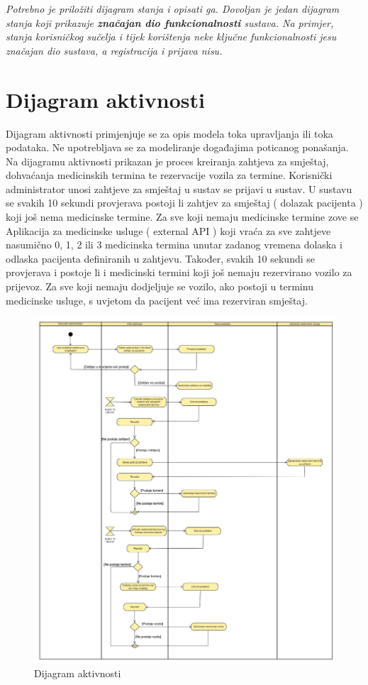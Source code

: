 			\textit{Potrebno je priložiti dijagram stanja i opisati ga. Dovoljan je jedan dijagram stanja koji prikazuje \textbf{značajan dio funkcionalnosti} sustava. Na primjer, stanja korisničkog sučelja i tijek korištenja neke ključne funkcionalnosti jesu značajan dio sustava, a registracija i prijava nisu. }
			
			
			\eject 
		
		\section{Dijagram aktivnosti}
			
			Dijagram aktivnosti primjenjuje se za opis modela toka upravljanja ili toka podataka. Ne upotrebljava se za modeliranje događajima poticanog ponašanja. 
			Na dijagramu aktivnosti prikazan je proces kreiranja zahtjeva za smještaj, dohvaćanja medicinskih termina te rezervacije vozila za termine. Korisnički administrator unosi zahtjeve za smještaj u sustav se prijavi u sustav. U sustavu se svakih 10 sekundi provjerava postoji li zahtjev za smještaj ( dolazak pacijenta ) koji još nema medicinske termine. Za sve koji nemaju medicinske termine zove se Aplikacija za medicinske usluge ( external API ) koji vraća za sve zahtjeve nasumično 0, 1, 2 ili 3 medicinska termina unutar zadanog vremena dolaska i odlaska pacijenta definiranih u zahtjevu. Također, svakih 10 sekundi se provjerava i postoje li i medicinski termini koji još nemaju rezervirano vozilo za prijevoz. Za sve koji nemaju dodjeljuje se vozilo, ako postoji u terminu medicinske usluge, s uvjetom da pacijent već ima rezerviran smještaj.
			
			\begin{figure}[H]
				\includegraphics[width=\textwidth]{slike/activityDiagram.png}
				\centering
				\caption{Dijagram aktivnosti}
				\label{fig:dijagram-aktivnosti}
			\end{figure}
			
